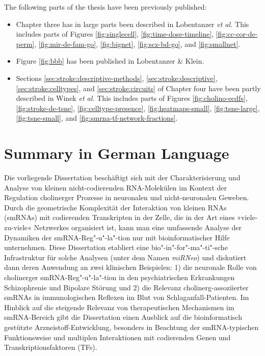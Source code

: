 \noindent The following parts of the thesis have been previously published:
\begin{itemize}[noitemsep, leftmargin=.5cm, label={\tiny\raisebox{.5ex}{\textbullet}}, topsep = 0pt]
\item Chapter three has in large parts been described in Lobentanzer \emph{et al.}\cite{Lobentanzer2019a} This includes parts of Figures \ref{fig:singlecell}, \ref{fig:time-dose-timeline}, \ref{fig:cc-cor-de-perm}, \ref{fig:mir-de-fam-go}, \ref{fig:bignet}, \ref{fig:scz-bd-go}, and \ref{fig:smallnet}.
\item Figure \ref{fig:bbb} has been published in Lobentanzer \& Klein.\cite{Lobentanzer2019b}
\item Sections \ref{sec:stroke:descriptive-methods}, \ref{sec:stroke:descriptive}, \ref{sec:stroke:celltypes}, and \ref{sec:stroke:circuits} of Chapter four have been partly described in Winek \emph{et al.}\cite{Winek2020} This includes parts of Figures \ref{fig:cholino-ecdfs}, \ref{fig:stroke-de-tsne}, \ref{fig:celltype-presence}, \ref{fig:heatmaps-small}, \ref{fig:tsne-large}, \ref{fig:tsne-small}, and \ref{fig:smrna-tf-network-fractions}.
\end{itemize}

\newpage

\section{Summary in German Language}


Die vorliegende Dissertation beschäftigt sich mit der Charakterisierung und Analyse von kleinen nicht-codierenden RNA-Molekülen im Kontext der Regulation cholinerger Prozesse in neuronalen und nicht-neuronalen Geweben. Durch die geometrische Komplexität der Interaktion von kleinen RNAs (smRNAs) mit codierenden Transkripten in der Zelle, die in der Art eines »viele-zu-viele« Netzwerkes organisiert ist, kann man eine umfassende Analyse der Dynamiken der smRNA-Reg"-u"-la"-tion nur mit bioinformatischer Hilfe unternehmen. Diese Dissertation etabliert eine bio"-in"-for"-ma"-ti"-sche Infrastruktur für solche Analysen (unter dem Namen \emph{miRNeo}) und diskutiert dann deren Anwendung an zwei klinischen Beispielen: 1) die neuronale Rolle von cholinerger smRNA-Reg"-u"-la"-tion in den psychiatrischen Erkrankungen Schizophrenie und Bipolare Störung\cite{Lobentanzer2019a} und 2) die Relevanz cholinerg-assoziierter smRNAs in immunologischen Reflexen im Blut von Schlaganfall-Patienten.\cite{Winek2020} Im Hinblick auf die steigende Relevanz von therapeutischen Mechanismen im smRNA-Bereich gibt die Dissertation einen Ausblick auf die bioinformatisch gestützte Arzneistoff-Entwicklung, besonders in Beachtung der smRNA-typischen Funktionsweise und multiplen Interaktionen mit codierenden Genen und Transkriptionsfaktoren (TFs).


